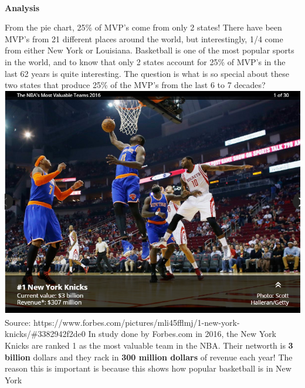 \documentclass[11pt]{article}
\makeatletter
\def\maxwidth{\ifdim\Gin@nat@width>\linewidth\linewidth
    \else\Gin@nat@width\fi}
\let\Oldincludegraphics\includegraphics
\renewcommand{\includegraphics}[1]{\Oldincludegraphics[width=.8\maxwidth]{#1}}
\makeatother
\begin{document}
    \begin{center}
    \end{center}
    { \hspace*{\fill} \\}
    
    \textbf{Analysis} \newline

From the pie chart, 25\% of MVP's come from only 2 states! There have
been MVP's from 21 different places around the world, but interestingly,
1/4 come from either New York or Louisiana. Basketball is one of the
most popular sports in the world, and to know that only 2 states account
for 25\% of MVP's in the last 62 years is quite interesting. The
question is what is so special about these two states that produce 25\%
of the MVP's from the last 6 to 7 decades? \newline
\newline
\includegraphics{nykworth1.png} \newline  Source:
https://www.forbes.com/pictures/mli45fflmj/1-new-york-knicks/\#3382942f2de0
\newline
\newline
In study done by Forbes.com in 2016, the New York Knicks are ranked 1 as
the most valuable team in the NBA. Their networth is \textbf{3 billion}
dollars and they rack in \textbf{300 million dollars} of revenue each
year! The reason this is important is because this shows how popular
basketball is in New York \newline
\newline
\end{document}
